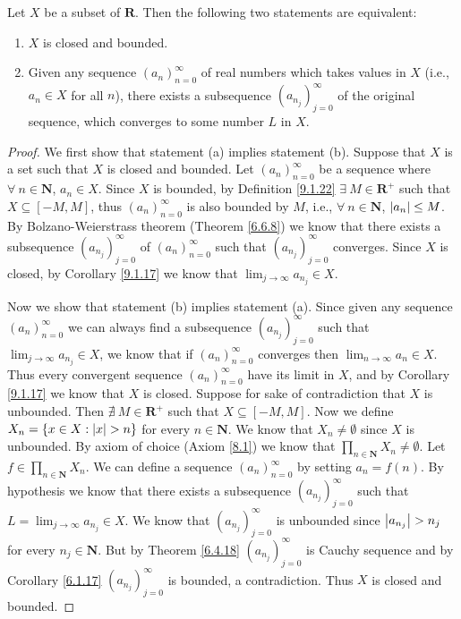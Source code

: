\begin{theorem}\label{9.1.24}
    Let \(X\) be a subset of \(\mathbf{R}\).
    Then the following two statements are equivalent:
    \begin{enumerate}
        \item \(X\) is closed and bounded.
        \item Given any sequence \((a_n)_{n = 0}^\infty\) of real numbers which takes values in \(X\) (i.e., \(a_n \in X\) for all \(n\)), there exists a subsequence \((a_{n_j})_{j = 0}^\infty\) of the original sequence, which converges to some number \(L\) in \(X\).
    \end{enumerate}
\end{theorem}

\begin{proof}
    We first show that statement (a) implies statement (b).
    Suppose that \(X\) is a set such that \(X\) is closed and bounded.
    Let \((a_n)_{n = 0}^\infty\) be a sequence where \(\forall\ n \in \mathbf{N}\), \(a_n \in X\).
    Since \(X\) is bounded, by Definition \ref{9.1.22} \(\exists\ M \in \mathbf{R}^+\) such that \(X \subseteq [-M, M]\), thus \((a_n)_{n = 0}^\infty\) is also bounded by \(M\), i.e., \(\forall\ n \in \mathbf{N}\), \(\abs*{a_n} \leq M\).
    By Bolzano-Weierstrass theorem (Theorem \ref{6.6.8}) we know that there exists a subsequence \((a_{n_j})_{j = 0}^\infty\) of \((a_n)_{n = 0}^\infty\) such that \((a_{n_j})_{j = 0}^\infty\) converges.
    Since \(X\) is closed, by Corollary \ref{9.1.17} we know that \(\lim_{j \to \infty} a_{n_j} \in X\).

    Now we show that statement (b) implies statement (a).
    Since given any sequence \((a_n)_{n = 0}^\infty\) we can always find a subsequence \((a_{n_j})_{j = 0}^\infty\) such that \(\lim_{j \to \infty} a_{n_j} \in X\), we know that if \((a_n)_{n = 0}^\infty\) converges then \(\lim_{n \to \infty} a_n \in X\).
    Thus every convergent sequence \((a_n)_{n = 0}^\infty\) have its limit in \(X\), and by Corollary \ref{9.1.17} we know that \(X\) is closed.
    Suppose for sake of contradiction that \(X\) is unbounded.
    Then \(\nexists\ M \in \mathbf{R}^+\) such that \(X \subseteq [-M, M]\).
    Now we define \(X_n = \{x \in X : \abs*{x} > n\}\) for every \(n \in \mathbf{N}\).
    We know that \(X_n \neq \emptyset\) since \(X\) is unbounded.
    By axiom of choice (Axiom \ref{8.1}) we know that \(\prod_{n \in \mathbf{N}} X_n \neq \emptyset\).
    Let \(f \in \prod_{n \in \mathbf{N}} X_n\).
    We can define a sequence \((a_n)_{n = 0}^\infty\) by setting \(a_n = f(n)\).
    By hypothesis we know that there exists a subsequence \((a_{n_j})_{j = 0}^\infty\) such that \(L = \lim_{j \to \infty} a_{n_j} \in X\).
    We know that \((a_{n_j})_{j = 0}^\infty\) is unbounded since \(\abs*{a_{n_j}} > n_j\) for every \(n_j \in \mathbf{N}\).
    But by Theorem \ref{6.4.18} \((a_{n_j})_{j = 0}^\infty\) is Cauchy sequence and by Corollary \ref{6.1.17} \((a_{n_j})_{j = 0}^\infty\) is bounded, a contradiction.
    Thus \(X\) is closed and bounded.
\end{proof}

